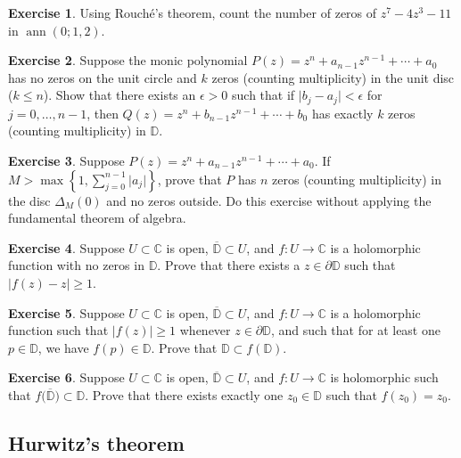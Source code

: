 \documentclass[12pt,openany]{book}
\newcommand{\ann}{\operatorname{ann}}
\newcommand{\sabs}[1]{\lvert {#1} \rvert}
\newcommand{\C}{{\mathbb{C}}}
\newcommand{\D}{{\mathbb{D}}}
\theoremstyle{plain}
\theoremstyle{remark}
\theoremstyle{definition}
\newenvironment{exbox}{%
    \def\FrameCommand{\vrule width 1pt \relax\hspace{10pt}}%
    \MakeFramed{\advance\hsize-\width\FrameRestore}%
}{%
    \endMakeFramed
}
\theoremstyle{exercise}
\newtheorem{exercise}{Exercise}[section]
\theoremstyle{example}
\begin{document}
\begin{exbox}
\begin{exercise}
Using Rouch\'e's theorem, count the number of zeros of $z^7-4z^3-11$ in $\ann(0;1,2)$.
\end{exercise}

\begin{exercise}
Suppose 
the monic polynomial
$P(z) = z^n + a_{n-1} z^{n-1} + \cdots + a_0$
has no zeros on the unit circle and $k$ zeros
(counting multiplicity)
in the unit disc ($k \leq n$).  Show that there exists an $\epsilon > 0$ such that
if $\sabs{b_j-a_j} < \epsilon$ for $j=0,\ldots,n-1$, then
$Q(z) = z^n + b_{n-1} z^{n-1} + \cdots + b_0$ has
exactly $k$ zeros (counting multiplicity) in $\D$.
\end{exercise}

\begin{exercise}
Suppose 
$P(z) = z^n + a_{n-1} z^{n-1} + \cdots + a_0$.
If $M > \max\left\{ 1, \sum_{j=0}^{n-1} \sabs{a_j} \right\}$,
prove that $P$ has $n$ zeros (counting multiplicity) in the disc $\Delta_M(0)$
and no zeros outside.  Do this exercise without applying the fundamental theorem of
algebra.
\end{exercise}

\begin{exercise}
Suppose $U \subset \C$ is open, $\overline{\D} \subset U$,
and $f \colon U \to \C$ is a holomorphic function with no zeros in
$\D$.  Prove that there exists a $z \in \partial \D$
such that $\sabs{f(z)-z} \geq 1$.
\end{exercise}

\begin{exercise}
Suppose $U \subset \C$ is open, $\overline{\D} \subset U$,
and $f \colon U \to \C$ is a holomorphic function such
that $\sabs{f(z)} \geq 1$ whenever $z \in \partial \D$,
and such that for at least one $p \in \D$, we have $f(p) \in \D$.
Prove that $\D \subset f(\D)$.
\end{exercise}

\begin{exercise}
Suppose $U \subset \C$ is open, $\overline{\D} \subset U$,
and $f \colon U \to \C$ is holomorphic such
that $f\bigl(\overline{\D}\bigr) \subset \D$.
Prove that there exists
exactly one $z_0 \in \D$ such that $f(z_0) = z_0$.
\end{exercise}
\end{exbox}

\subsection{Hurwitz's theorem}
\end{document}
